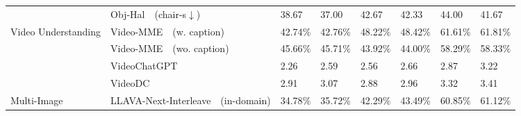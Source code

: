 \begin{table}[t!]
{\begin{tabular}{p{1.5cm}p{3cm}p{1.5cm}p{1.6cm}p{1.5cm}p{1.6cm}p{1.5cm}p{1.6cm}}
     & Obj-Hal~\cite{li2023evaluating}~\tiny{(chair-s$\downarrow$)} \newline \tiny{\color{light-gray}{Object Hallucination.}} &38.67 & \cellcolor{front-color} 37.00 \tiny{\color{brown}{+1.67}} & 42.67 & \cellcolor{front-color}42.33 \tiny{\color{brown}{+0.34}} & 44.00 & \cellcolor{front-color}41.67 \tiny{\color{brown}{+2.33}}  \\
\cmidrule{2-8}
    \multirow{4}{*}{\parbox{1.5cm}{Video Understanding}} 
     & Video-MME~\cite{fu2024video}~\tiny{(w. caption)} \newline\tiny{\color{light-gray}{Multi-discip}} & 42.74\tiny{\%} & \cellcolor{front-color} 42.76\tiny{\%} \tiny{\color{brown}{+0.02\%}} &48.22\tiny{\%} & \cellcolor{front-color} 48.42\tiny{\%} \tiny{\color{brown}{+0.20\%}} & 61.61\tiny{\%} & \cellcolor{front-color}61.81\tiny{\%} \tiny{\color{brown}{+0.20\%}}  \\
    & Video-MME~\cite{fu2024video}~\tiny{(wo. caption)} \newline\tiny{\color{light-gray}{Multi-discip}} & 45.66\tiny{\%} & \cellcolor{front-color} 45.71\tiny{\%} \tiny{\color{brown}{+0.05\%}} & 43.92\tiny{\%} & \cellcolor{front-color} 44.00\tiny{\%} \tiny{\color{brown}{+0.08\%}} & 58.29\tiny{\%} & \cellcolor{front-color}58.33\tiny{\%} \tiny{\color{brown}{+0.04\%}}  \\
     & VideoChatGPT~\cite{Maaz2023VideoChatGPT} \newline  \tiny{\color{light-gray}{Video Conversation}}  & 2.26 & \cellcolor{front-color} 2.59 \tiny{\color{brown}{+0.33}} & 2.56 & \cellcolor{front-color} 2.66 \tiny{\color{brown}{+0.10}} & 2.87 & \cellcolor{front-color}3.22 \tiny{\color{brown}{+0.35}}  \\
     & VideoDC~\cite{li2024llavanext-strong} \newline \tiny{\color{light-gray}{Video Detail Description}} & 2.91 & \cellcolor{front-color} 3.07 \tiny{\color{brown}{+0.16}} & 2.88 & \cellcolor{front-color} 2.96 \tiny{\color{brown}{+0.08}} & 3.32 & \cellcolor{front-color}3.41 \tiny{\color{brown}{+0.09}}  \\
\cmidrule{2-8}
    \multirow{2}{*}{\parbox{1.5cm}{Multi-Image}} 
    & LLAVA-Next-Interleave~\cite{li2024llava}~\tiny{(in-domain)} \newline\tiny{\color{light-gray}{in-domian}} & 34.78\tiny{\%} & \cellcolor{front-color} 35.72\tiny{\%} \tiny{\color{brown}{+0.94\%}} & 42.29\tiny{\%} & \cellcolor{front-color} 43.49\tiny{\%} \tiny{\color{brown}{+1.20\%}} & 60.85\tiny{\%} & \cellcolor{front-color}61.12\tiny{\%} \tiny{\color{brown}{+0.27\%}}  \\

\end{tabular}}
\end{table}
